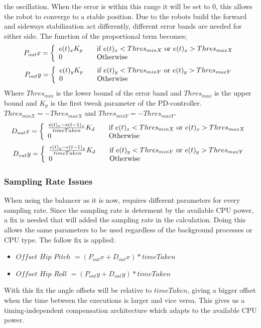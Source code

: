 \documentclass[a4paper]{article}
\begin{document}
the oscillation. When the error is within this range it will be set to 0, this
allows the robot to converge to a stable position. Due to the robots build the
forward and sideways stabilization act differently, different error bands are
needed for either side. The function of the proportional term becomes;
\[
  P_{out}x = \left\{ 
  \begin{array}{l l}
     e(t)_xK_p& \quad \text{if $e(t)_x < Thres_{min X}$ or $e(t)_x > Thres_{max X}$}\\ 
     0& \quad \text{Otherwise}\\
  \end{array} \right.
\]
\[
  P_{out}y = \left\{ 
  \begin{array}{l l}
      e(t)_yK_p& \quad \text{if $e(t)_y < Thres_{min Y}$ or $e(t)_y > Thres_{max Y}$}\\ 
     0& \quad \text{Otherwise}\\
  \end{array} \right.
\]
Where $Thres_{min}$ is the lower bound of the error band and $Thres_{max}$ is the upper bound
and $K_p$ is the  first tweak parameter of the PD-controller.\\
$Thres_{min X} = -Thres_{max X}$ and
$Thres_{min Y} = -Thres_{max Y}$.
\[
  D_{out}x = \left\{ 
  \begin{array}{l l}
      \frac{e(t)_x - e(t-1)_x}{timeTaken}K_d& \quad \text{if $e(t)_x < Thres_{min X}$  or $e(t)_x > Thres_{max X}$}\\ 
     0& \quad \text{Otherwise}\\
  \end{array} \right.
\]
\[
  D_{out}y = \left\{ 
  \begin{array}{l l}
     \frac{ e(t)_y - e(t-1)_y}{timeTaken}K_d& \quad \text{if $e(t)_y < Thres_{min Y}$ or $e(t)_y > Thres_{max Y}$}\\ 
     0& \quad \text{Otherwise}\\
  \end{array} \right.
\]

\subsubsection{Sampling Rate Issues}

When using the balancer as it is now, requires different parameters for every sampling rate.
Since the sampling rate is determent by the available CPU power, a fix is needed that will added the sampling rate in the calculation.
Doing this allows the same parameters to be used regardless of the background processes or CPU type.
The follow fix is applied:
\begin{itemize}
	\item $Offset$ $Hip$ $Pitch$ $= (P_{out}x + D_{out}x) * timeTaken $ 
	\item $Offset$ $Hip$ $Roll$ $=  (P_{out}y + D_{out}y) * timeTaken$ 
\end{itemize}
With this fix the angle offsets will be relative to $timeTaken$, giving a bigger offset when the time between the executions is larger and vice versa.
This gives us a timing-independent compensation architecture which adapts to the available CPU power.
\end{document}
